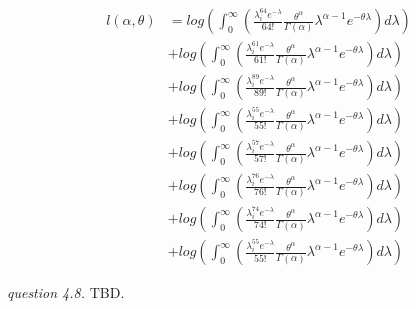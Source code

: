 \documentclass{article}
\begin{document}
\begin{align*}
    l(\alpha, \theta)&=log\left(\int_0^\infty\left(\frac{\lambda_i^{64}e^{-\lambda}}{64!}\frac{\theta^\alpha}{\Gamma(\alpha)}\lambda^{\alpha-1}e^{-\theta\lambda}\right)d\lambda\right)\\&+
    log\left(\int_0^\infty\left(\frac{\lambda_i^{61}e^{-\lambda}}{61!}\frac{\theta^\alpha}{\Gamma(\alpha)}\lambda^{\alpha-1}e^{-\theta\lambda}\right)d\lambda\right)\\&+
    log\left(\int_0^\infty\left(\frac{\lambda_i^{89}e^{-\lambda}}{89!}\frac{\theta^\alpha}{\Gamma(\alpha)}\lambda^{\alpha-1}e^{-\theta\lambda}\right)d\lambda\right)\\&+
    log\left(\int_0^\infty\left(\frac{\lambda_i^{55}e^{-\lambda}}{55!}\frac{\theta^\alpha}{\Gamma(\alpha)}\lambda^{\alpha-1}e^{-\theta\lambda}\right)d\lambda\right)\\&+
    log\left(\int_0^\infty\left(\frac{\lambda_i^{57}e^{-\lambda}}{57!}\frac{\theta^\alpha}{\Gamma(\alpha)}\lambda^{\alpha-1}e^{-\theta\lambda}\right)d\lambda\right)\\&+
    log\left(\int_0^\infty\left(\frac{\lambda_i^{76}e^{-\lambda}}{76!}\frac{\theta^\alpha}{\Gamma(\alpha)}\lambda^{\alpha-1}e^{-\theta\lambda}\right)d\lambda\right)\\&+
    log\left(\int_0^\infty\left(\frac{\lambda_i^{74}e^{-\lambda}}{74!}\frac{\theta^\alpha}{\Gamma(\alpha)}\lambda^{\alpha-1}e^{-\theta\lambda}\right)d\lambda\right)\\&+
    log\left(\int_0^\infty\left(\frac{\lambda_i^{55}e^{-\lambda}}{55!}\frac{\theta^\alpha}{\Gamma(\alpha)}\lambda^{\alpha-1}e^{-\theta\lambda}\right)d\lambda\right)
\end{align*}



\vspace{\baselineskip}
\textit{question 4.8.}
TBD.
\end{document}
